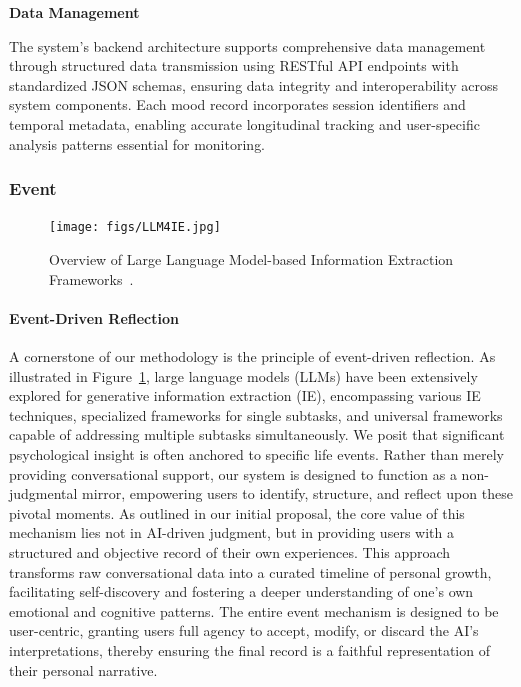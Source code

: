 \textbf{Data Management}

The system's backend architecture supports comprehensive data management through structured data transmission using RESTful API endpoints with standardized JSON schemas, ensuring data integrity and interoperability across system components. Each mood record incorporates session identifiers and temporal metadata, enabling accurate longitudinal tracking and user-specific analysis patterns essential for monitoring.


\subsubsection{Event}

\begin{figure}[h]
    \centering
    \texttt{[image: figs/LLM4IE.jpg]}
    \caption{Overview of Large Language Model-based Information Extraction Frameworks~\cite{xu2023large}.}
    \label{fig:LLM4IE}
\end{figure}

\paragraph{Event-Driven Reflection}
A cornerstone of our methodology is the principle of event-driven reflection. As illustrated in Figure~\ref{fig:LLM4IE}, large language models (LLMs) have been extensively explored for generative information extraction (IE), encompassing various IE techniques, specialized frameworks for single subtasks, and universal frameworks capable of addressing multiple subtasks simultaneously. We posit that significant psychological insight is often anchored to specific life events. Rather than merely providing conversational support, our system is designed to function as a non-judgmental mirror, empowering users to identify, structure, and reflect upon these pivotal moments. As outlined in our initial proposal, the core value of this mechanism lies not in AI-driven judgment, but in providing users with a structured and objective record of their own experiences. This approach transforms raw conversational data into a curated timeline of personal growth, facilitating self-discovery and fostering a deeper understanding of one's own emotional and cognitive patterns. The entire event mechanism is designed to be user-centric, granting users full agency to accept, modify, or discard the AI's interpretations, thereby ensuring the final record is a faithful representation of their personal narrative.

